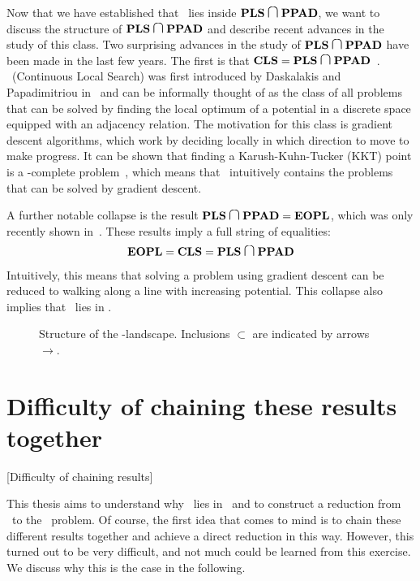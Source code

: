 Now that we have established that \Tarski\ lies inside $\PLS \medcap \PPAD$, we want to discuss the structure of $\PLS \medcap \PPAD$ and describe recent advances in the study of this class. Two surprising advances in the study of $\PLS \medcap \PPAD$ have been made in the last few years. The first is that $\CLS = \PLS \medcap \PPAD$~. \CLS\ (Continuous Local Search) was first introduced by Daskalakis and Papadimitriou in~ and can be informally thought of as the class of all problems that can be solved by finding the local optimum of a potential in a discrete space equipped with an adjacency relation. The motivation for this class is gradient descent algorithms, which work by deciding locally in which direction to move to make progress. It can be shown that finding a Karush-Kuhn-Tucker (KKT) point is a \CLS-complete problem~\cite{daskalakis_continuous_2011}, which means that \CLS\ intuitively contains the problems that can be solved by gradient descent.

A further notable collapse is the result $\PLS \medcap \PPAD = \EOPL$, which was only recently shown in~. These results imply a full string of equalities:
\begin{align*}
	\EOPL = \CLS = \PLS \medcap \PPAD
\end{align*}
Intuitively, this means that solving a problem using gradient descent can be reduced to walking along a line with increasing potential. This collapse also implies that \Tarski\ lies in \EOPL\@.

\begin{figure*}
	\centering
	\large
	\caption[\TFNP-landscape]{Structure of the \TFNP-landscape. Inclusions $\subset$ are indicated by arrows $\rightarrow$.}\label{fig:tfnp_structure}
\end{figure*}

\section{Difficulty of chaining these results together}[Difficulty of chaining results]

This thesis aims to understand why \Tarski\ lies in \EOPL\ and to construct a reduction from \Tarski\ to the \EndOfPotentialLine\ problem. Of course, the first idea that comes to mind is to chain these different results together and achieve a direct reduction in this way. However, this turned out to be very difficult, and not much could be learned from this exercise. We discuss why this is the case in the following.

